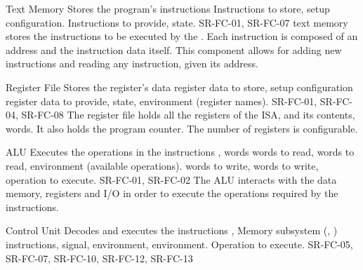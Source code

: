 \begin{component}{Text Memory}
  {Stores the program's instructions}  %
  {\NA}  %
  {Instructions to store, setup configuration.}  %
  {Instructions to provide, state.}  %
  {SR-FC-01, SR-FC-07}  %
  \Gls{text memory} stores the instructions to be executed by the . Each instruction is composed of an address and the instruction data itself. This component allows for adding new instructions and reading any instruction, given its address.
\end{component}

\begin{component}{Register File}
  {Stores the \gls{register}'s data}  %
  {\NA}  %
  {\Gls{register} data to store, setup configuration}  %
  {\Gls{register} data to provide, state, environment (register names).}  %
  {SR-FC-01, SR-FC-04, SR-FC-08}  %
  The \gls{register} file holds all the \glspl{register} of the \gls{ISA}, and its contents, \glspl{word}. It also holds the \gls{program counter}. The number of registers is configurable.
\end{component}

\begin{component}{ALU}
  {Executes the operations in the instructions}  %
  {,  words}  %
  { words to read,  words to read, environment (available operations).}  %
  { words to write,  words to write, operation to execute.}  %
  {SR-FC-01, SR-FC-02}  %
  The \gls{ALU} interacts with the \gls{data memory}, \glspl{register} and \gls{I/O} in order to execute the operations required by the instructions.
\end{component}

\begin{component}{Control Unit}
  {Decodes and executes the instructions}  %
  {, Memory subsystem (, )}  %
  { instructions,  signal,  environment,  environment.}  %
  {Operation to execute.}  %
  {SR-FC-05, SR-FC-07, SR-FC-10, SR-FC-12, SR-FC-13}  %
\end{component}

